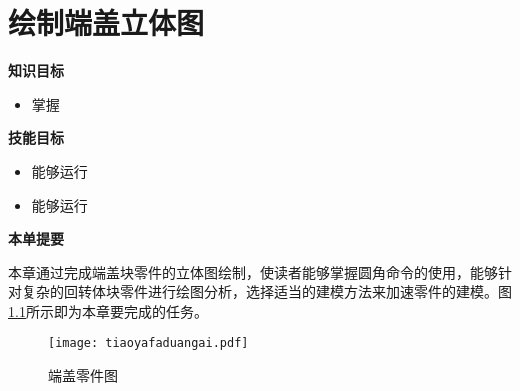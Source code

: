 \chapter{绘制端盖立体图}\label{chap:duangai}

{\bfseries 知识目标}
\begin{itemize}
\item 掌握
\end{itemize}

{\bfseries 技能目标}
\begin{itemize}
\item 能够运行
\item 能够运行
\end{itemize}

{\bfseries 本单提要}

本章通过完成端盖块零件的立体图绘制，使读者能够掌握圆角命令的使用，能够针对复杂的回转体块零件进行绘图分析，选择适当的建模方法来加速零件的建模。图\ref{fig:tiaoyafaduangai}所示即为本章要完成的任务。
\noindent
\begin{figure}[htbp]
\centering
\texttt{[image: tiaoyafaduangai.pdf]}
\caption{端盖零件图}\label{fig:tiaoyafaduangai}
\end{figure}
\endinput
